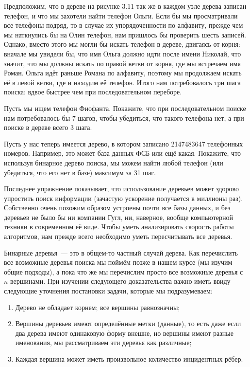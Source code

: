 Предположим, что в дереве на рисунке 3.11 так же в каждом узле дерева записан телефон, и что мы захотели найти телефон Ольги. Если бы мы просматривали все телефоны подряд, то в случае их упорядоченности по алфавиту, прежде чем мы наткнулись бы на Олин телефон, нам пришлось бы проверить шесть записей. Однако, вместо этого мы могли бы искать телефон в дереве, двигаясь от корня: вначале мы увидели бы, что имя Ольга должно идти после имени Николай, что значит, что мы должны искать по правой ветви от корня, где мы встречаем имя Роман. Ольга идёт раньше Романа по алфавиту, поэтому мы продолжаем искать её в левой ветви, где и находим её телефон. Итого нам потребовалось три шага поиска: вдвое быстрее чем при последовательном переборе.

\begin{exercise}
Пусть мы ищем телефон Фиофанта. Покажите, что при последовательном поиске нам потребовалось бы 7 шагов, чтобы убедиться, что такого телефона нет, а при поиске  в дереве всего 3 шага.
\end{exercise}

\begin{exercise}
Пусть у нас теперь имеется дерево, в котором записано 2147483647 телефонных номеров. Например, это может база данных ФСБ или ещё какая. Покажите, что используя бинарное дерево поиска, мы можем найти любой телефон (или убедиться, что его нет в базе) максимум за 31 шаг.
\end{exercise}

Последнее упражнение показывает, что использование деревьев может здорово упростить поиск информации (зачастую ускорение получается в миллионы раз). Собственно очень похожим образом устроены почти все базы данных, и без деревьев не было бы ни компании Гугл, ни, наверное, вообще компьютерной техники в современном её виде. Чтобы уметь анализировать скорость работы алгоритмов, нам прежде всего необходимо уметь пересчитывать все деревья.

Бинарные деревья~--- это в общем-то частный случай дерева. Как перечислить все возможные деревья поиска мы поймём позже в нашем курсе (мы изучим общие подходы), а пока что же мы перечислим  просто все возможные деревья с $n$ вершинами. При изучении следующего доказательства важно иметь ввиду следующие уточнения постановки задачи, которые мы подразумеваем:
\begin{enumerate}
\item Дерево не обладает корнем; все вершины равнозначны;
\item Вершины деревьев имеют определённые метки (данные), то есть даже если два дерева имеют одинаковую форму внешне, но вершины имеют разные именования, мы рассматриваем эти деревья как различные;
\item Каждая вершина может иметь произвольное количество инцидентных рёбер.
\end{enumerate}

